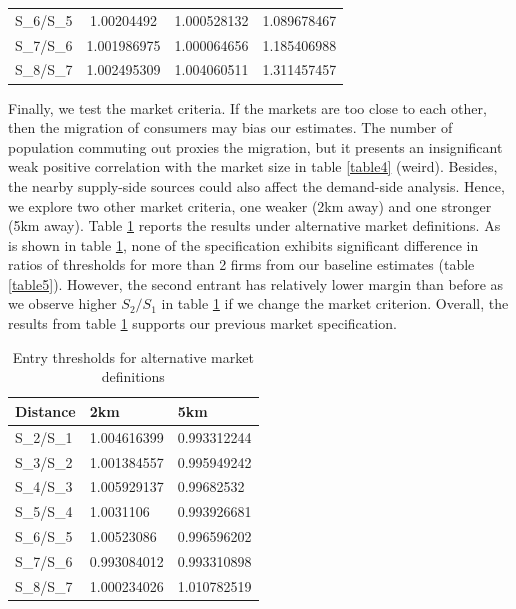 \documentclass[a4paper,11pt]{article}
\begin{document}
\begin{table}[htbp]
{\begin{tabular}{cccc}
S\_6/S\_5                 & 1.00204492  & 1.000528132                                     & 1.089678467                                                                                                                                                                     \\
S\_7/S\_6                 & 1.001986975 & 1.000064656                                     & 1.185406988                                                                                                                                                                     \\
S\_8/S\_7                 & 1.002495309 & 1.004060511                                     & 1.311457457  \\ \bottomrule                                                                    
\end{tabular}}
\end{table}

Finally, we test the market criteria. If the markets are too close to each other, then the migration of consumers may bias our estimates. The number of population commuting out proxies the migration, but it presents an insignificant weak positive correlation with the market size in table \ref{table4} (weird). Besides, the nearby supply-side sources could also affect the demand-side analysis. Hence, we explore two other market criteria, one weaker (2km away) and one stronger (5km away). Table \ref{table9} reports the results under alternative market definitions. As is shown in table \ref{table9}, none of the specification exhibits significant difference in ratios of thresholds for more than 2 firms from our baseline estimates (table \ref{table5}).  However, the second entrant has relatively lower margin than before as we observe higher $S_2/S_1$ in table \ref{table9} if we change the market criterion. Overall, the results from table \ref{table9} supports our previous market specification. 

\begin{table}[ht]
\centering
\caption{Entry thresholds for alternative market definitions}
\label{table9}
\begin{tabular}{@{}lll@{}}
\toprule
Distance & 2km         & 5km         \\ \midrule
S\_2/S\_1    & 1.004616399 & 0.993312244 \\
S\_3/S\_2    & 1.001384557 & 0.995949242 \\
S\_4/S\_3    & 1.005929137 & 0.99682532  \\
S\_5/S\_4    & 1.0031106   & 0.993926681 \\
S\_6/S\_5    & 1.00523086  & 0.996596202 \\
S\_7/S\_6    & 0.993084012 & 0.993310898 \\
S\_8/S\_7    & 1.000234026 & 1.010782519 \\ \bottomrule
\end{tabular}
\end{table}
\end{document}
